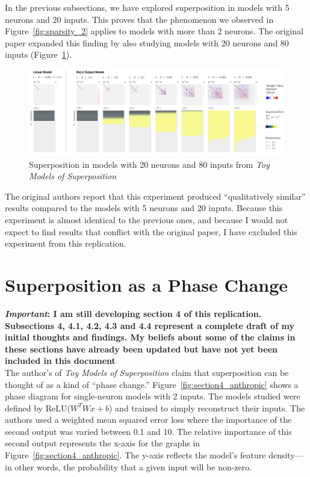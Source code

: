 \documentclass{article} %
\begin{document}
In the previous subsections, we have explored superposition in models with 5
neurons and 20 inputs. This proves that the phenomenon we observed in Figure~\ref{fig:sparsity_2}
applies to models with more than 2 neurons. The original paper expanded this 
finding by also studying models with 20 neurons and 80 inputs (Figure~\ref{fig:section3_anthropic2}). \\

\begin{figure}[h]
    \centering
    \includegraphics[width=0.99\linewidth]{demonstrating_superposition/images/anthropic_section3_part2.png}
    \captionsetup{font=footnotesize, width=0.7\linewidth} %
    \caption{
        Superposition in models with 20 neurons and 80 inputs from \textit{Toy Models of Superposition}\cite{elhage2022toy}
    }
    \label{fig:section3_anthropic2}
\end{figure}

The original authors report that this experiment produced ``qualitatively similar''
results compared to the models with 5 neurons and 20 inputs. Because this experiment 
is almost identical to the previous ones, and because I would not expect to find 
results that conflict with the original paper, I have excluded this experiment 
from this replication. \\

\section{Superposition as a Phase Change}

\textbf{\textit{Important}: I am still developing section 4 of this replication. 
Subsections 4, 4.1, 4.2, 4.3 and 4.4 represent a complete draft of my initial 
thoughts and findings. My beliefs about some of the claims in these sections
have already been updated but have not yet been included in this document} \\

The author's of \textit{Toy Models of Superposition} claim that superposition
can be thought of as a kind of ``phase change.'' Figure~\ref{fig:section4_anthropic}
shows a phase diagram for single-neuron models with 2 inputs. The models studied were
defined by ReLU($W^TWx + b$) and trained to simply reconstruct their inputs. The authors 
used a weighted mean squared error loss where the importance of 
the second output was varied between 0.1 and 10. The relative importance of this
second output represents the x-axis for the graphs in Figure~\ref{fig:section4_anthropic}.
The y-axis reflects the model's feature density---in other words, the probability
that a given input will be non-zero.
\end{document}
